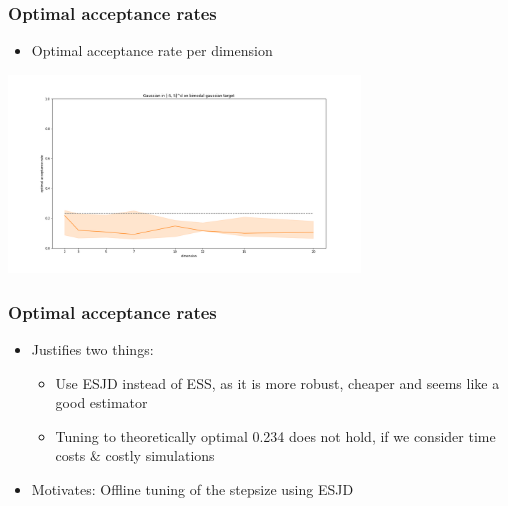 \begin{frame}[t]
    \frametitle{Optimal acceptance rates}
    \begin{itemize}
    \item Optimal acceptance rate per dimension
    \end{itemize}
    \centering
    \includegraphics[width=0.7\textwidth]{imgs/bound-5-Gaussian.png}
\end{frame}

\begin{frame}[c]
    \frametitle{Optimal acceptance rates}
    \begin{itemize}
        \item Justifies two things:
        \begin{itemize}
            \item Use ESJD instead of ESS, as it is more robust, cheaper and seems like a good estimator
            \item Tuning to theoretically optimal 0.234 does not hold, if we consider time costs \& costly simulations
        \end{itemize}
        \item Motivates: Offline tuning of the stepsize using ESJD
    \end{itemize}
\end{frame}

